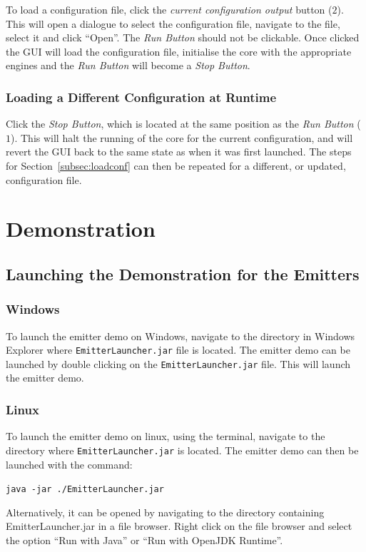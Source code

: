 \documentclass[10pt,a4paper]{article}
\begin{document}
To load a configuration file, click the \emph{current configuration output} button ($2$). This will open a dialogue to select the configuration file, navigate to the file, select it and click ``Open''. The \emph{Run Button} should not be clickable. Once clicked the GUI will load the configuration file, initialise the core with the appropriate engines and the \emph{Run Button} will become a \emph{Stop Button}.

\subsubsection{Loading a Different Configuration at Runtime}

Click the \emph{Stop Button}, which is located at the same position as the \emph{Run Button} ($1$). This will halt the running of the core for the current configuration, and will revert the GUI back to the same state as when it was first launched. The steps for Section~\ref{subsec:loadconf} can then be repeated for a different, or updated, configuration file.

\section{Demonstration}
\label{subsec:demo}
\subsection{Launching the Demonstration for the Emitters}
\subsubsection{Windows}
To launch the emitter demo on Windows, navigate to the directory in Windows Explorer where \texttt{EmitterLauncher.jar} file is located. The emitter demo can be launched by double clicking on the \texttt{EmitterLauncher.jar} file. This will launch the emitter demo.
\subsubsection{Linux}
To launch the emitter demo on linux, using the terminal, navigate to the directory where \texttt{EmitterLauncher.jar} is located. The emitter demo can then be launched with the command:
\begin{center}
\texttt{java -jar ./EmitterLauncher.jar}
\end{center}
Alternatively, it can be opened by navigating to the directory containing EmitterLauncher.jar in a file browser. Right click on the file browser and select the option ``Run with Java'' or ``Run with OpenJDK Runtime''.
\end{document}
